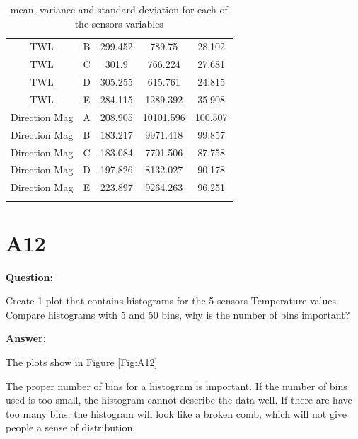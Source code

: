 \documentclass[a4paper]{article}
\numberwithin{figure}{section}
\numberwithin{table}{section}
\begin{document}
\begin{longtable}{ccccc}
TWL  & B & 299.452 & 789.75 & 28.102 \\
TWL  & C & 301.9 & 766.224 & 27.681 \\
TWL  & D & 305.255 & 615.761 & 24.815 \\
TWL  & E & 284.115 & 1289.392 & 35.908 \\
Direction Mag & A & 208.905 & 10101.596 & 100.507 \\
Direction Mag & B & 183.217 & 9971.418 & 99.857 \\
Direction Mag & C & 183.084 & 7701.506 & 87.758 \\
Direction Mag & D & 197.826 & 8132.027 & 90.178 \\
Direction Mag & E & 223.897 & 9264.263 & 96.251 \\
\hline
\caption{mean, variance and standard deviation for each of the sensors variables}
\label{TableA11}
\end{longtable}

\section{A12}

\textbf{Question:} 

Create 1 plot that contains histograms for the 5 sensors Temperature values. Compare histograms with 5 and 50 bins, why is the number of bins important?

\textbf{Answer:} 

The plots show in Figure \ref{Fig:A12}

The proper number of bins for a histogram is important. If the number of bins used is too small, the histogram cannot describe the data well. If there are have too many bins, the histogram will look like a broken comb, which will not give people a sense of distribution.
\end{document}
